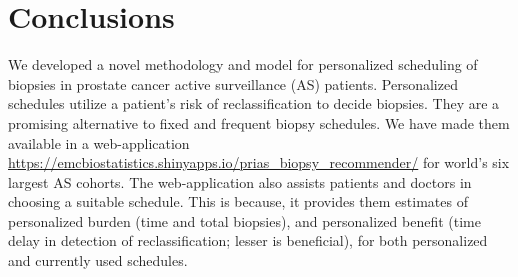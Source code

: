 \section{Conclusions}
We developed a novel methodology and model for personalized scheduling of biopsies in prostate cancer active surveillance (AS) patients. Personalized schedules utilize a patient's risk of reclassification to decide biopsies. They are a promising alternative to fixed and frequent biopsy schedules. We have made them available in a web-application \url{https://emcbiostatistics.shinyapps.io/prias_biopsy_recommender/} for world's six largest AS cohorts. The web-application also assists patients and doctors in choosing a suitable schedule. This is because, it provides them estimates of personalized burden (time and total biopsies), and personalized benefit (time delay in detection of reclassification; lesser is beneficial), for both personalized and currently used schedules.